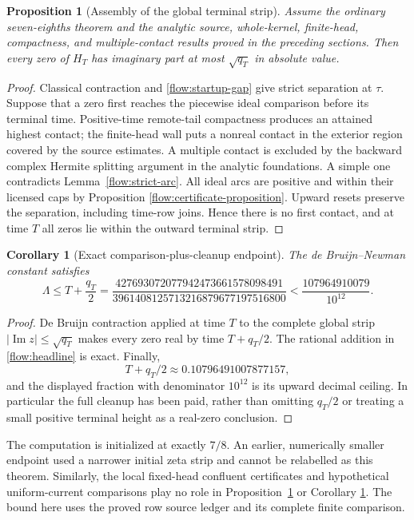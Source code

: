 \documentclass[11pt,a4paper]{article}
\newtheorem{proposition}[theorem]{Proposition}
\newtheorem{corollary}[theorem]{Corollary}
\theoremstyle{definition}
\theoremstyle{remark}
\newcommand{\Lam}{\Lambda}
\newcommand{\Imm}{\operatorname{Im}}
\begin{document}
\begin{proposition}[Assembly of the global terminal strip]
\label{flow:global-terminal}
Assume the ordinary seven-eighths theorem and the analytic source,
whole-kernel, finite-head, compactness, and multiple-contact results
proved in the preceding sections.  Then every zero of $H_T$ has
imaginary part at most $\sqrt{q_T}$ in absolute value.
\end{proposition}
\begin{proof}
Classical contraction and \eqref{flow:startup-gap} give strict separation
at $\tau$.  Suppose that a zero first reaches the piecewise ideal
comparison before its terminal time.  Positive-time remote-tail
compactness produces an attained highest contact; the finite-head wall
puts a nonreal contact in the exterior region covered by the source
estimates.  A multiple contact is excluded by the backward complex
Hermite splitting argument in the analytic foundations.  A simple one
contradicts Lemma~\ref{flow:strict-arc}.  All ideal arcs are positive and
within their licensed caps by Proposition
\ref{flow:certificate-proposition}.  Upward resets preserve the
separation, including time-row joins.  Hence there is no first contact,
and at time $T$ all zeros lie within the outward terminal strip.
\end{proof}

\begin{corollary}[Exact comparison-plus-cleanup endpoint]
\label{flow:endpoint}
The de Bruijn--Newman constant satisfies
\begin{equation}
 \Lam\leq T+\frac{q_T}{2}
 =\frac{427693072077942473661578098491}
 {3961408125713216879677197516800}
 <\frac{107964910079}{10^{12}}.
 \label{flow:headline}
\end{equation}
\end{corollary}
\begin{proof}
De Bruijn contraction applied at time $T$ to the complete global strip
$|\Imm z|\leq\sqrt{q_T}$ makes every zero real by time $T+q_T/2$.
The rational addition in \eqref{flow:headline} is exact.  Finally,
\[
 T+q_T/2\approx0.10796491007877157,
\]
and the displayed fraction with denominator $10^{12}$ is its upward
decimal ceiling.  In particular the full cleanup has been paid, rather
than omitting $q_T/2$ or treating a small positive terminal height as a
real-zero conclusion.
\end{proof}

The computation is initialized at exactly $7/8$.  An earlier, numerically
smaller endpoint used a narrower initial zeta strip and cannot be
relabelled as this theorem.  Similarly, the local fixed-head confluent
certificates and hypothetical uniform-current comparisons play no role
in Proposition~\ref{flow:global-terminal} or Corollary
\ref{flow:endpoint}.  The bound here uses the proved row source ledger
and its complete finite comparison.
\end{document}
